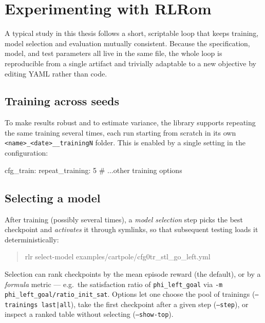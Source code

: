 \section{Experimenting with RLRom}
\label{sec:workflow}

A typical study in this thesis follows a short, scriptable loop that keeps
training, model selection and evaluation mutually consistent. Because the
specification, model, and test parameters all live in the same file, the whole loop
is reproducible from a single artifact and trivially adaptable to a new objective by
editing YAML rather than code.

\subsection{Training across seeds}
To make results robust and to estimate variance, the library supports repeating the
same training several times, each run starting from scratch in its own
\texttt{<name>\_<date>\_\_trainingN} folder. This is enabled by a single setting in
the configuration:
\begin{cfglisting}[caption={Repeating training across seeds.},label={lst:repeat}]
cfg_train:
  repeat_training: 5
  # ...other training options
\end{cfglisting}

\subsection{Selecting a model}
After training (possibly several times), a \emph{model selection} step picks the
best checkpoint and \emph{activates} it through symlinks, so that subsequent
testing loads it deterministically:
\begin{quote}\ttfamily
rlr select-model examples/cartpole/cfg0tr\_stl\_go\_left.yml
\end{quote}
Selection can rank checkpoints by the mean episode reward (the default), or by a
\emph{formula} metric --- e.g.\ the satisfaction ratio of \texttt{phi\_left\_goal}
via \texttt{-m phi\_left\_goal/ratio\_init\_sat}. Options let one choose the pool of
trainings (\texttt{--trainings last|all}), take the first checkpoint after a given
step (\texttt{--step}), or inspect a ranked table without selecting
(\texttt{--show-top}).

